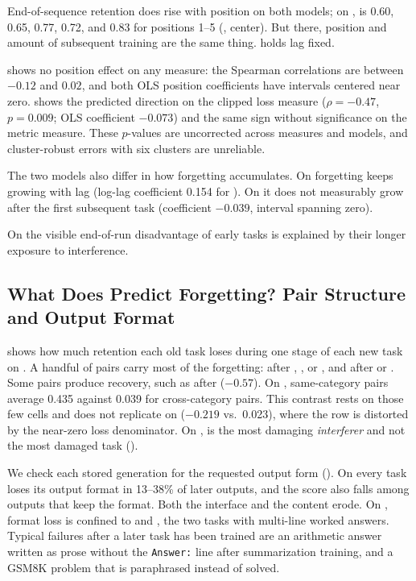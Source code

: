 

End-of-sequence retention does rise with position on both models; on \llama, \rrel is 0.60, 0.65, 0.77, 0.72, and 0.83 for positions 1--5 (, center).
But there, position and amount of subsequent training are the same thing.
 holds lag fixed.

\llama shows no position effect on any measure: the Spearman correlations are between $-0.12$ and $0.02$, and both OLS position coefficients have intervals centered near zero.
\qwen shows the predicted direction on the clipped loss measure ($\rho = -0.47$, $p = 0.009$; OLS coefficient $-0.073$) and the same sign without significance on the metric measure.
These $p$-values are uncorrected across measures and models, and cluster-robust errors with six clusters are unreliable.

The two models also differ in how forgetting accumulates.
On \llama forgetting keeps growing with lag (log-lag coefficient 0.154 for \rrel).
On \qwen it does not measurably grow after the first subsequent task (coefficient $-0.039$, interval spanning zero).

On \llama the visible end-of-run disadvantage of early tasks is explained by their longer exposure to interference.

\subsection{What Does Predict Forgetting? Pair Structure and Output Format}
\label{sec:pairs}




 shows how much retention each old task loses during one stage of each new task on \llama.
A handful of pairs carry most of the forgetting: \tlogic after \tarith, \tgsm, or \tsumm, and \tmt after \tsumm or \temo.
Some pairs produce recovery, such as \tlogic after \tmt ($-0.57$).
On \llama, same-category pairs average 0.435 against 0.039 for cross-category pairs.
This contrast rests on those few cells and does not replicate on \qwen ($-0.219$ vs.\ 0.023), where the \tmt row is distorted by the near-zero loss denominator.
On \qwen, \tlogic is the most damaging \emph{interferer} and not the most damaged task ().

We check each stored generation for the requested output form ().
On \llama every task loses its output format in 13--38\% of later outputs, and the score also falls among outputs that keep the format.
Both the interface and the content erode.
On \qwen, format loss is confined to \tgsm and \tarith, the two tasks with multi-line worked answers.
Typical failures after a later task has been trained are an arithmetic answer written as prose without the \texttt{Answer:} line after summarization training, and a GSM8K problem that is paraphrased instead of solved.

